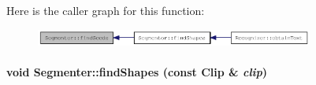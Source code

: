 Here is the caller graph for this function:\nopagebreak
\begin{figure}[H]
\begin{center}
\leavevmode
\includegraphics[width=259pt]{class_segmenter_bacab187b543a51c5322c01fc0a29ffb_icgraph}
\end{center}
\end{figure}
\hypertarget{class_segmenter_465c8e755bb56d247add080a04377520}{
\paragraph[{findShapes}]{\setlength{\rightskip}{0pt plus 5cm}void Segmenter::findShapes (const {\bf Clip} \& {\em clip})}\hfill}
\label{class_segmenter_465c8e755bb56d247add080a04377520}


